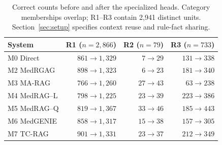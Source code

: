 \begin{table}[tb]
\centering
\small
\caption{Correct counts before and after the specialized heads. Category memberships overlap; R1--R3 contain 2,941 distinct units. Section~\ref{sec:setup} specifies context reuse and rule-fact sharing.}
\label{tab:seven-heads}
\begin{tabular*}{\linewidth}{@{\extracolsep{\fill}}lrrr@{}}
\toprule
System & R1 ($n=2{,}866$) & R2 ($n=79$) & R3 ($n=733$) \\
\midrule
M0 Direct & $861 \rightarrow 1,329$ & $7 \rightarrow 29$ & $131 \rightarrow 338$ \\
M2 MedRGAG & $898 \rightarrow 1,323$ & $6 \rightarrow 23$ & $181 \rightarrow 340$ \\
M3 MA-RAG & $766 \rightarrow 1,260$ & $27 \rightarrow 43$ & $63 \rightarrow 238$ \\
M4 MedRAG--L & $798 \rightarrow 1,225$ & $23 \rightarrow 39$ & $223 \rightarrow 386$ \\
M5 MedRAG--Q & $819 \rightarrow 1,367$ & $33 \rightarrow 46$ & $185 \rightarrow 443$ \\
M6 MedGENIE & $858 \rightarrow 1,317$ & $15 \rightarrow 38$ & $157 \rightarrow 305$ \\
M7 TC-RAG & $901 \rightarrow 1,331$ & $23 \rightarrow 37$ & $212 \rightarrow 349$ \\
\bottomrule
\end{tabular*}
\end{table}
